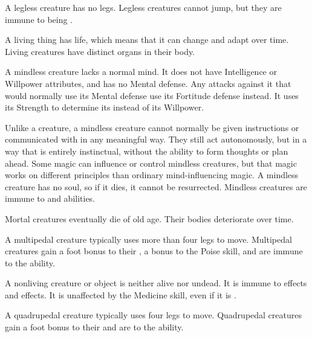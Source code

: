   A legless creature has no legs.
  Legless creatures cannot jump, but they are immune to being \prone.

  A living thing has life, which means that it can change and adapt over time.
  Living creatures have distinct organs in their body.

  A mindless creature lacks a normal mind.
  It does not have Intelligence or Willpower attributes, and has no Mental defense.
  Any attacks against it that would normally use its Mental defense use its Fortitude defense instead.
  It uses its Strength to determine its  instead of its Willpower.

  Unlike a  creature, a mindless creature cannot normally be given instructions or communicated with in any meaningful way.
  They still act autonomously, but in a way that is entirely instinctual, without the ability to form thoughts or plan ahead.
  Some magic can influence or control mindless creatures, but that magic works on different principles than ordinary mind-influencing magic.
  A mindless creature has no soul, so if it dies, it cannot be resurrected.
  Mindless creatures are immune to  and  abilities.

   Mortal creatures eventually die of old age.
  Their bodies deteriorate over time.

  A multipedal creature typically uses more than four legs to move.
  Multipedal creatures gain a  foot bonus to their , a  bonus to the Poise skill, and are immune to the  ability.

  A nonliving creature or object is neither alive nor undead.
  It is immune to \atLife effects and \atPoison effects.
  It is unaffected by the Medicine skill, even if it is .


  A quadrupedal creature typically uses four legs to move.
  Quadrupedal creatures gain a  foot bonus to their  and are \resistant to the  ability.

